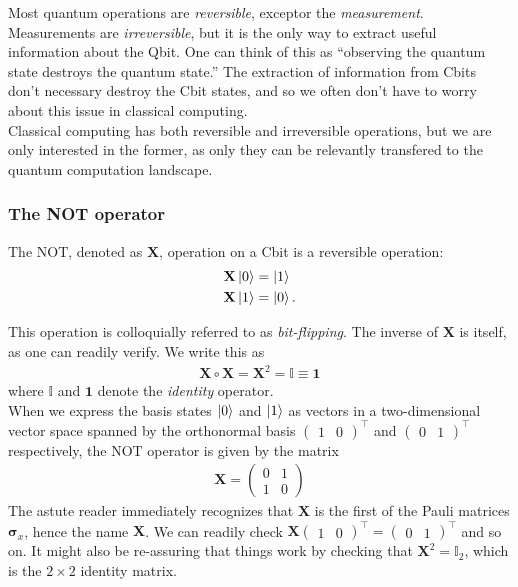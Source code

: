 \documentclass{book}
\theoremstyle{definition}
\newcommand{\nn}{\nonumber}
\newcommand{\X}{\mathbf{X}}
\begin{document}
Most quantum operations are \textit{reversible}, exceptor the \textit{measurement}. Measurements are \textit{irreversible}, but it is the only way to extract useful information about the Qbit. One can think of this as ``observing the quantum state destroys the quantum state.'' The extraction of information from Cbits don't necessary destroy the Cbit states, and so we often don't have to worry about this issue in classical computing. \\

Classical computing has both reversible and irreversible operations, but we are only interested in the former, as only they can be relevantly transfered to the quantum computation landscape. 

\subsubsection{The NOT operator}

The NOT, denoted as $\textbf{X}$, operation on a Cbit is a reversible operation:
\begin{align}
\textbf{X}\ket{0} &= \ket{1} \nn\\
\textbf{X}\ket{1} &= \ket{0} .
\end{align}

This operation is colloquially referred to as \textit{bit-flipping}. The inverse of $\mathbf{X}$ is itself, as one can readily verify. We write this as
\begin{align}
\mathbf{X}\circ \mathbf{X} = \mathbf{X}^2 = \mathbb{I} \equiv \mathbf{1}
\end{align}
where $\mathbb{I}$ and $\mathbf{1}$ denote the \textit{identity} operator. \\

When we express the basis states $\ket{0}$ and $\ket{1}$ as vectors in a two-dimensional vector space spanned by the orthonormal basis $\begin{pmatrix}
1&0
\end{pmatrix}^\top$ and $\begin{pmatrix}
0&1
\end{pmatrix}^\top$ respectively, the NOT operator is given by the matrix
\begin{align}
\boxed{\mathbf{X} = \begin{pmatrix}
0&1 \\ 1&0
\end{pmatrix}}
\end{align}
The astute reader immediately recognizes that $\X$ is the first of the Pauli matrices $\bm{\sigma}_x$, hence the name $\X$. We can readily check $\mathbf{X}\begin{pmatrix}
1&0
\end{pmatrix}^\top = \begin{pmatrix}
0&1
\end{pmatrix}^\top$ and so on. It might also be re-assuring that things work by checking that $\mathbf{X}^2 = \mathbb{I}_2$, which is the $2\times 2$ identity matrix. 
\end{document}
